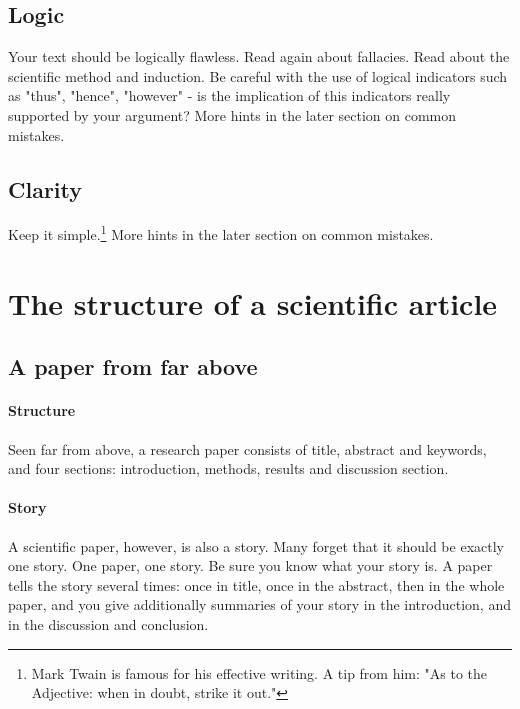 \documentclass{tufte-book}
\begin{document}
\subsection{Logic}

Your text should be logically flawless. Read again about fallacies. Read about the scientific method and induction. Be careful with the use of logical indicators such as "thus", "hence", "however" - is the implication of this indicators really supported by your argument? More hints in the later section on common mistakes.

\subsection{Clarity}

Keep it simple.\footnote{Mark Twain is famous for his effective writing. A tip from him: "As to the Adjective: when in doubt, strike it out."} More hints in the later section on common mistakes.

\section{The structure of a scientific article}   

\subsection{A paper from far above}

\paragraph{Structure}Seen far from above, a research paper consists of title, abstract and keywords, and four sections: introduction, methods, results and discussion section. 

\paragraph{Story}A scientific paper, however, is also a story. Many forget that it should be exactly one story. One paper, one story. Be sure you know what your story is. A paper tells the story several times: once in title, once in the abstract, then in the whole paper, and you give additionally summaries of your story in the introduction, and in the discussion and  conclusion.

\end{document}
